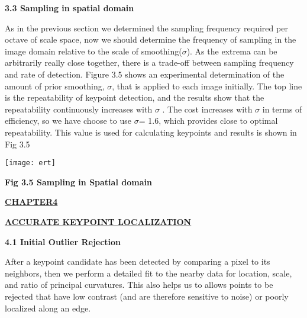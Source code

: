\documentclass[12pt,a4paper]{report}
\begin{document}
\begin{flushleft}
\newpage



\textbf{3.3 Sampling  in spatial domain}
\vspace{10mm}

As in the previous section we determined the sampling frequency required per octave of scale space, now we should  determine the frequency of sampling in the image domain relative to the scale of smoothing($\sigma$). As the extrema can be arbitrarily really close together, there is a trade-off between sampling frequency and rate of detection. Figure 3.5 shows an experimental determination of the amount of prior smoothing, $\sigma$, that is applied to each image initially. The top line is the repeatability of keypoint detection, and the results show that the repeatability continuously increases with $ \sigma$ . The cost increases with  $\sigma$ in terms of efficiency, so we have choose to use  $\sigma$= 1.6, which provides close to optimal repeatability. This value is used for calculating keypoints and  results is shown in  Fig 3.5


\vspace{10mm}

\begin{center}\texttt{[image: ert]}\end{center}
\begin{center}\textbf{Fig 3.5 Sampling in Spatial domain}\end{center}

\newpage





\begin{center}\underline{ \Large \textbf{CHAPTER4}}\end{center}
\begin{center}\underline{ \Large \textbf{ACCURATE KEYPOINT LOCALIZATION}}\end{center}
\vspace{10mm}


\textbf{4.1 Initial Outlier Rejection}

\vspace{10mm}

After a keypoint candidate has been detected by comparing a pixel to its neighbors, then
we  perform a detailed fit to the nearby data for location, scale, and ratio of principal curvatures. This also helps us to  allows points to be rejected that have low contrast (and are therefore sensitive to noise) or poorly localized along an edge.\par


\end{flushleft}
\end{document}
